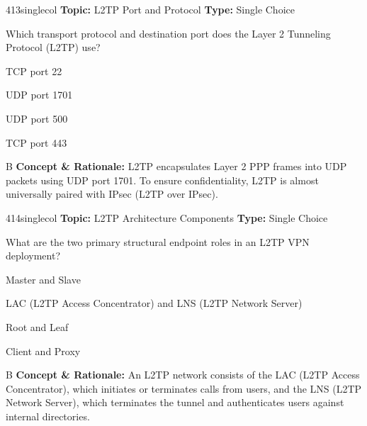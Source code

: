 \begin{qcard}{413}{singlecol}
\textcolor{darkslate!75}{\small\textbf{Topic:} L2TP Port and Protocol \hfill \textbf{Type:} Single Choice}\vspace{0.4em}\par
Which transport protocol and destination port does the Layer 2 Tunneling Protocol (L2TP) use?
\begin{qoptions}
\item TCP port 22
\item UDP port 1701
\item UDP port 500
\item TCP port 443
\end{qoptions}
\end{qcard}
\nopagebreak
\begin{explainbox}{B}
\textbf{Concept \& Rationale:} L2TP encapsulates Layer 2 PPP frames into UDP packets using UDP port 1701. To ensure confidentiality, L2TP is almost universally paired with IPsec (L2TP over IPsec).
\end{explainbox}

\begin{qcard}{414}{singlecol}
\textcolor{darkslate!75}{\small\textbf{Topic:} L2TP Architecture Components \hfill \textbf{Type:} Single Choice}\vspace{0.4em}\par
What are the two primary structural endpoint roles in an L2TP VPN deployment?
\begin{qoptions}
\item Master and Slave
\item LAC (L2TP Access Concentrator) and LNS (L2TP Network Server)
\item Root and Leaf
\item Client and Proxy
\end{qoptions}
\end{qcard}
\nopagebreak
\begin{explainbox}{B}
\textbf{Concept \& Rationale:} An L2TP network consists of the LAC (L2TP Access Concentrator), which initiates or terminates calls from users, and the LNS (L2TP Network Server), which terminates the tunnel and authenticates users against internal directories.
\end{explainbox}

